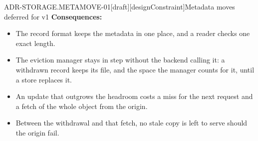 \begin{requirement}{ADR-STORAGE.METAMOVE-01}[draft][designConstraint]{Metadata moves deferred for v1}
  \textbf{Consequences:}
  \begin{itemize}
    \item[+] The record format keeps the metadata in one place, and a reader
      checks one exact length.
    \item[+] The eviction manager stays in step without the backend calling
      it: a withdrawn record keeps its file, and the space the manager
      counts for it, until a store replaces it.
    \item[--] An update that outgrows the headroom costs a miss for the next
      request and a fetch of the whole object from the origin.
    \item[--] Between the withdrawal and that fetch, no stale copy is left to
      serve should the origin fail.
  \end{itemize}



\end{requirement}

